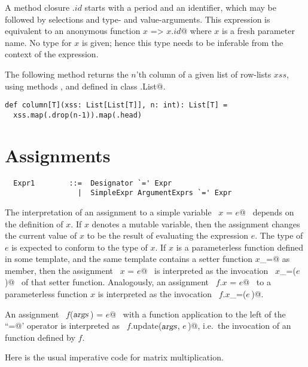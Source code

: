 A method closure $.id$ starts with a period and an identifier, which
may be followed by selections and type- and value-arguments. This
expression is equivalent to an anonymous function
\lstinline@$x$ => $x.id$@ where $x$ is a fresh parameter name. No type
for $x$ is given; hence this type needs to be inferable from the
context of the expression.

\example The following method returns the $n$'th column of a given
list of row-lists $xss$, using methods \lstinline@map@,
\lstinline@drop@ and \lstinline@head@ defined in class
\lstinline@scala.List@.
\begin{lstlisting}
def column[T](xss: List[List[T]], n: int): List[T] = 
  xss.map(.drop(n-1)).map(.head)
\end{lstlisting}
 
\section{Assignments}\label{sec:assigments}

\syntax\begin{lstlisting}
  Expr1        ::=  Designator `=' Expr
                 |  SimpleExpr ArgumentExprs `=' Expr
\end{lstlisting}

The interpretation of an assignment to a simple variable ~\lstinline@$x$ = $e$@~
depends on the definition of $x$. If $x$ denotes a mutable
variable, then the assignment changes the current value of $x$ to be
the result of evaluating the expression $e$. The type of $e$ is
expected to conform to the type of $x$. If $x$ is a parameterless
function defined in some template, and the same template contains a
setter function \lstinline@$x$_=@ as member, then the assignment
~\lstinline@$x$ = $e$@~ is interpreted as the invocation
~\lstinline@$x$_=($e\,$)@~ of that setter function.  Analogously, an
assignment ~\lstinline@$f.x$ = $e$@~ to a parameterless function $x$
is interpreted as the invocation ~\lstinline@$f.x$_=($e\,$)@.

An assignment ~\lstinline@$f$($\mbox{\sl args}\,$) = $e$@~ with a function application to the
left of the ``\lstinline@=@' operator is interpreted as 
~\lstinline@$f.$update($\mbox{\sl args}$, $e\,$)@, i.e.\
the invocation of an  function defined by $f$.

\example \label{ex:imp-mat-mul}
Here is the usual imperative code for matrix multiplication.

